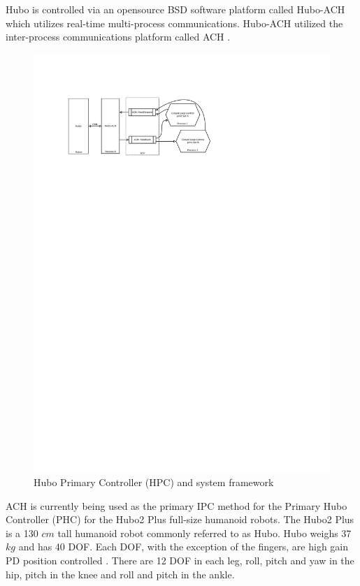 Hubo is controlled via an opensource BSD software platform called Hubo-ACH which utilizes real-time multi-process communications.  Hubo-ACH utilized the inter-process communications platform called ACH \cite{dantam2012ach}.

\begin{figure}[thpb]
  \centering
\includegraphics[width=1.0\columnwidth]{./pix/hubo-ach-diagram.pdf}
  \caption{Hubo Primary Controller (HPC) and system framework}
  \label{fig:graph}
\end{figure}



ACH is currently being used as the primary IPC method for the Primary Hubo Controller (PHC) for the Hubo2 Plus full-size humanoid robots.  
The Hubo2 Plus is a 130 $cm$ tall humanoid robot commonly referred to as Hubo.  
Hubo weighs 37 $kg$ and has 40 DOF.
Each DOF, with the exception of the fingers, are high gain PD position controlled .  
There are 12 DOF in each leg, roll, pitch and yaw in the hip, pitch in the knee and roll and pitch in the ankle.  

